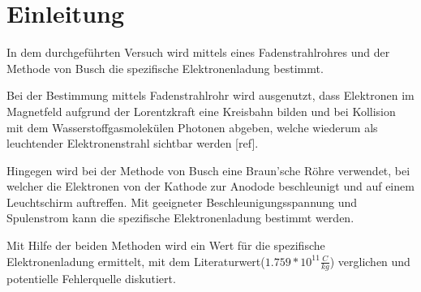 \chapter{Einleitung}
In dem durchgeführten Versuch wird mittels eines Fadenstrahlrohres und der Methode von Busch die spezifische Elektronenladung bestimmt. 

Bei der Bestimmung mittels Fadenstrahlrohr wird ausgenutzt, dass Elektronen im Magnetfeld aufgrund der Lorentzkraft eine Kreisbahn bilden und bei Kollision mit dem Wasserstoffgasmolekülen Photonen abgeben, welche wiederum als leuchtender Elektronenstrahl sichtbar werden [ref].

Hingegen wird bei der Methode von Busch eine Braun'sche Röhre verwendet, bei welcher die Elektronen von der Kathode zur Anodode beschleunigt und auf einem Leuchtschirm auftreffen. Mit geeigneter Beschleunigungsspannung und Spulenstrom kann die spezifische Elektronenladung bestimmt werden.

Mit Hilfe der beiden Methoden wird ein Wert für die spezifische Elektronenladung ermittelt, mit dem Literaturwert($1.759*10^{11}\frac{C}{kg}$) verglichen und potentielle Fehlerquelle diskutiert.

